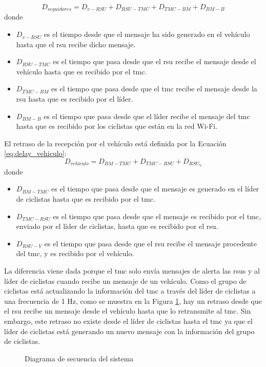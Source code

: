 \begin{equation}\label{eq:delay_seguidores}
D_{seguidores} = D_{v-RSU} + D_{RSU-TMC} + D_{TMC-BM} + D_{BM-B}
\end{equation}
donde
\begin{itemize}
	\item $D_{v-RSU}$ es el tiempo desde que el mensaje ha sido generado en el
	vehículo hasta que el \gls{rsu} recibe dicho mensaje.

	\item $D_{RSU-TMC}$ es el tiempo que pasa desde que el \gls{rsu} recibe el
	mensaje desde el vehículo hasta que es recibido por el \gls{tmc}.

	\item $D_{TMC-BM}$ es el tiempo que pasa desde que el \gls{tmc} recibe el
	mensaje desde la \gls{rsu} hasta que es recibido por el líder.

	\item $D_{BM-B}$ es el tiempo que pasa desde que el líder recibe el mensaje
	del \gls{tmc} hasta que es recibido por los ciclistas que están en la red
	Wi-Fi.
\end{itemize}

El retraso de la recepción por el vehículo está definida por la Ecuación
\ref{eq:delay_vehiculo}:
\begin{equation}\label{eq:delay_vehiculo}
D_{vehículo} = D_{BM-TMC} + D_{TMC-RSU} + D_{RSU_V}
\end{equation}
donde
\begin{itemize}
	\item $D_{BM-TMC}$ es el tiempo que pasa desde que el mensaje es generado en
	el líder de ciclistas hasta que es recibido por el \gls{tmc}.

	\item $D_{TMC-RSU}$ es el tiempo que pasa desde que el mensaje es recibido
	por el \gls{tmc}, enviado por el líder de ciclistas, hasta que es recibido
	por el \gls{rsu}.

	\item $D_{RSU-V}$ es el tiempo que pasa desde que el \gls{rsu} recibe el
	mensaje procedente del \gls{tmc}, y es recibido por el vehículo.
\end{itemize}

La diferencia viene dada porque el \gls{tmc} solo envía mensajes de alerta las
\gls{rsu}s y al líder de ciclistas cuando recibe un mensaje de un vehículo.
Como el grupo de ciclistas está actualizando la información del \gls{tmc} a
través del líder de ciclistas a una frecuencia de 1 Hz, como se muestra en la
Figura \ref{fig:simulacion-diagrama-secuencia}, hay un retraso desde que el
\gls{rsu} recibe un mensaje desde el vehículo hasta que lo retransmite al
\gls{tmc}. Sin embargo, este retraso no existe desde el líder de ciclistas
hasta el \gls{tmc} ya que el líder de ciclistas está generando un nuevo mensaje
con la información del grupo de ciclistas.


\begin{figure}[h]
	\begin{center}
	\end{center}
	\caption{Diagrama de secuencia del sistema}
	\label{fig:simulacion-diagrama-secuencia}
\end{figure}
